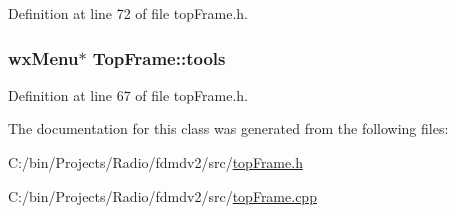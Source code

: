 Definition at line 72 of file top\-Frame.\-h.

\hypertarget{class_top_frame_a4471183520bb3cb8788cfa2e9786ea13}{
\subsubsection[{tools}]{\setlength{\rightskip}{0pt plus 5cm}wx\-Menu$\ast$ Top\-Frame\-::tools\hspace{0.3cm}{\ttfamily [protected]}}}\label{class_top_frame_a4471183520bb3cb8788cfa2e9786ea13}


Definition at line 67 of file top\-Frame.\-h.



The documentation for this class was generated from the following files\-:\begin{DoxyCompactItemize}
\item 
C\-:/bin/\-Projects/\-Radio/fdmdv2/src/\hyperlink{top_frame_8h}{top\-Frame.\-h}\item 
C\-:/bin/\-Projects/\-Radio/fdmdv2/src/\hyperlink{top_frame_8cpp}{top\-Frame.\-cpp}\end{DoxyCompactItemize}
